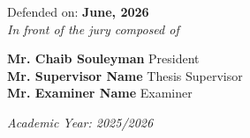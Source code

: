 \begin{titlepage}
{\normalsize Defended on: \textbf{June, 2026}}\\
{\normalsize \textit{In front of the jury composed of}}\\

\begin{center}
    {\normalsize \textbf{Mr. Chaib Souleyman} \hfill President}\\
    {\normalsize \textbf{Mr. Supervisor Name} \hfill Thesis Supervisor}\\
    {\normalsize \textbf{Mr. Examiner Name} \hfill Examiner}\\
\end{center}

\vspace{-0.3cm}

\normalsize \textit{Academic Year: 2025/2026}
\end{titlepage}
